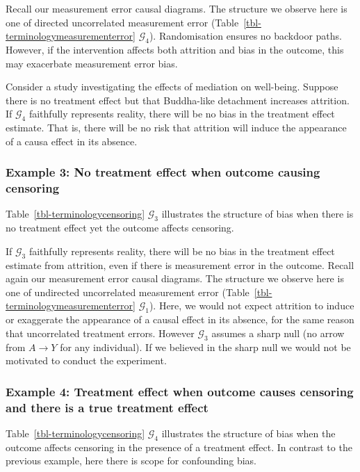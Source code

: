 \documentclass[
  single column]{article}
\begin{document}
Recall our measurement error causal diagrams. The structure we observe
here is one of directed uncorrelated measurement error
(Table~\ref{tbl-terminologymeasurementerror} \(\mathcal{G}_4\)).
Randomisation ensures no backdoor paths. However, if the intervention
affects both attrition and bias in the outcome, this may exacerbate
measurement error bias.

Consider a study investigating the effects of mediation on well-being.
Suppose there is no treatment effect but that Buddha-like detachment
increases attrition. If \(\mathcal{G}_4\) faithfully represents reality,
there will be no bias in the treatment effect estimate. That is, there
will be no risk that attrition will induce the appearance of a causa
effect in its absence.

\subsubsection{Example 3: No treatment effect when outcome causing
censoring}\label{example-3-no-treatment-effect-when-outcome-causing-censoring}

Table~\ref{tbl-terminologycensoring} \(\mathcal{G}_3\) illustrates the
structure of bias when there is no treatment effect yet the outcome
affects censoring.

If \(\mathcal{G}_3\) faithfully represents reality, there will be no
bias in the treatment effect estimate from attrition, even if there is
measurement error in the outcome. Recall again our measurement error
causal diagrams. The structure we observe here is one of undirected
uncorrelated measurement error
(Table~\ref{tbl-terminologymeasurementerror} \(\mathcal{G}_1\)). Here,
we would not expect attrition to induce or exaggerate the appearance of
a causal effect in its absence, for the same reason that uncorrelated
treatment errors. However \(\mathcal{G}_3\) assumes a sharp null (no
arrow from \(A\to Y\) for any individual). If we believed in the sharp
null we would not be motivated to conduct the experiment.

\subsubsection{Example 4: Treatment effect when outcome causes censoring
and there is a true treatment
effect}\label{example-4-treatment-effect-when-outcome-causes-censoring-and-there-is-a-true-treatment-effect}

Table~\ref{tbl-terminologycensoring} \(\mathcal{G}_4\) illustrates the
structure of bias when the outcome affects censoring in the presence of
a treatment effect. In contrast to the previous example, here there is
scope for confounding bias.
\end{document}
